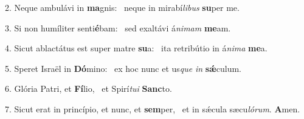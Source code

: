 2. Neque ambulávi in \textbf{ma}gnis: \ast\  neque in mirabí\textit{li}\textit{bus} \textbf{su}per me.\

3. Si non humíliter senti\textbf{é}bam: \ast\  sed exaltávi á\textit{ni}\textit{mam} \textbf{me}am.\

4. Sicut ablactátus est super matre \textbf{su}a: \ast\  ita retribútio in á\textit{ni}\textit{ma} \textbf{me}a.\

5. Speret Israël in \textbf{Dó}mino: \ast\  ex hoc nunc et us\textit{que} \textit{in} \textbf{sǽ}culum.\

6. Glória Patri, et \textbf{Fí}lio, \ast\  et Spirí\textit{tu}\textit{i} \textbf{Sanc}to.\

7. Sicut erat in princípio, et nunc, et \textbf{sem}per, \ast\  et in sǽcula sæcu\textit{ló}\textit{rum}. \textbf{A}men.\

